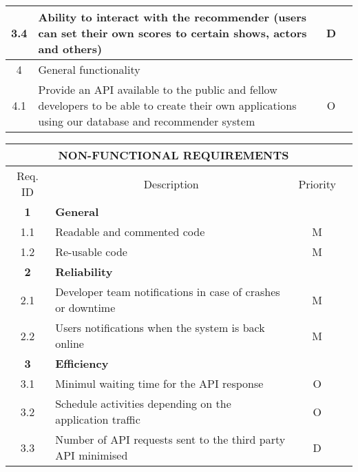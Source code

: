 \begin{tabularx}{\textwidth}{|c|X|c|X|}
3.4     & Ability to interact with the recommender (users can set their own scores to certain shows, actors and others)                                      & D        \\ \hline
4       & \multicolumn{2}{l|}{General functionality}                                                                                                                    \\ \hline
4.1     & Provide an API available to the public and fellow developers to be able to create their own applications using our database and recommender system & O        \\ \hline
\end{tabularx}

\label{non-functional-requirements-table}
\begin{tabularx}{\textwidth}{|c|X|c|X|}
\caption{Non-Functional requirements table}
\hline
\multicolumn{3}{|c|}{NON-FUNCTIONAL REQUIREMENTS}                                    \\ \hline
Req. ID    & \multicolumn{1}{c|}{Description}                             & Priority \\ \hline
\textbf{1} & \multicolumn{2}{l|}{\textbf{General}}                                   \\ \hline
1.1        & Readable and commented code                                  & M        \\ \hline
1.2        & Re-usable code                                               & M        \\ \hline
\textbf{2} & \multicolumn{2}{l|}{\textbf{Reliability}}                               \\ \hline
2.1        & Developer team notifications in case of crashes or downtime  & M        \\ \hline
2.2        & Users notifications when the system is back online           & M        \\ \hline
\textbf{3} & \multicolumn{2}{l|}{\textbf{Efficiency}}                                \\ \hline
3.1        & Minimul waiting time for the API response                    & O        \\ \hline
3.2        & Schedule activities depending on the application traffic     & O        \\ \hline
3.3        & Number of API requests sent to the third party API minimised & D        \\ \hline
\end{tabularx}

